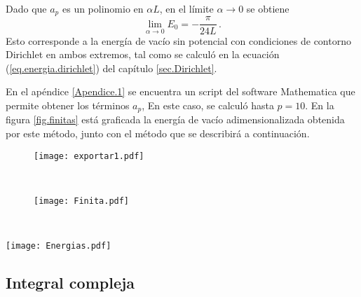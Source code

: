 Dado que $a _p$ es un polinomio en $\alpha L$, en el límite $\alpha \rightarrow 0$ se obtiene
\begin{equation}
\lim \limits_{\alpha \rightarrow 0} E _0 = 
		- \frac{\pi}{24 L}
\, .
\end{equation}
Esto corresponde a la energía de vacío sin potencial con condiciones de contorno Dirichlet en ambos extremos, tal como se calculó en la ecuación (\ref{eq.energia.dirichlet}) del capítulo \ref{sec.Dirichlet}.

En el apéndice \ref{Apendice.1} se encuentra un script del software Mathematica que permite obtener los términos $a _p$, En este caso, se calculó hasta $p=10$. En la figura \ref{fig.finitas} está graficada la energía de vacío adimensionalizada obtenida por este método, junto con el método que se describirá a continuación.



\begin{figure*}[t!]
    \centering
    \begin{subfigure}[t]{0.5\textwidth}
        \centering
        \texttt{[image: exportar1.pdf]}
        \caption{}
        \label{fig.derecha}
    \end{subfigure}%
    ~ 
    \begin{subfigure}[t]{0.5\textwidth}
        \centering
        \texttt{[image: Finita.pdf]}
        \caption{}
        \label{fig.izquierda}
    \end{subfigure}
    ~
    \caption{En esta imagen se muestran dos posibles adimensionalizaciones de la energía de vacío, una vez obtenida la curva \ref{fig.izquierda} se pueden generar todas las curvas de la figura \ref{fig:vacios}, haciendo los cambios de variables $\beta \rightarrow \alpha L$, $E _0 \rightarrow \frac{E _0}{\alpha}$.}
\label{fig.finitas}
\end{figure*}

\begin{figure*}[t!]
    \centering
        \centering
        \texttt{[image: Energias.pdf]}
        \caption{}
        \label{fig.izquierda123}
    \caption{En esta imagen se puede observar la dependencia de la energía de Casimir $E _0$ para distintos valores de $\alpha$ y $L$, puede verse que a medida que incrementa $\alpha$, la energía de vacío posee un máximo local más abrupto.}
\label{fig:vacios}
\end{figure*}




\subsection{Integral compleja}\label{sec.finita.compleja}

